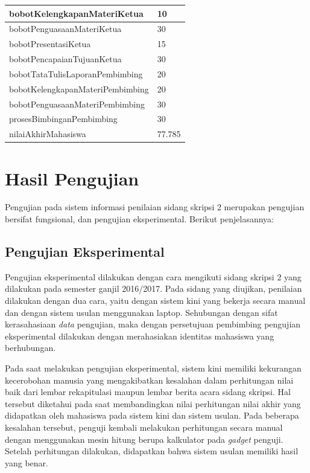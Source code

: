 \begin{enumerate}
\begin{table}[htbp]
\begin{tabular}{| m{7cm} | m{5cm} |}
				\hline
				bobotKelengkapanMateriKetua & 10\\
				\hline
				bobotPenguasaanMateriKetua & 30\\
				\hline
				bobotPresentasiKetua & 15\\
				\hline
				bobotPencapaianTujuanKetua & 30\\
				\hline
				bobotTataTulisLaporanPembimbing & 20\\
				\hline
				bobotKelengkapanMateriPembimbing &20\\
				\hline
				bobotPenguasaanMateriPembimbing & 30\\
				\hline
				prosesBimbinganPembimbing & 30\\
				\hline
				nilaiAkhirMahasiswa & 77.785\\
				\hline
			\end{tabular}
		\end{table}
	\end{enumerate}
	
\section{Hasil Pengujian}
\label{sec:hasilUji}

	Pengujian pada sistem informasi penilaian sidang skripsi 2 merupakan pengujian bersifat fungsional, dan pengujian eksperimental. Berikut penjelasannya:
	
	\subsection{Pengujian Eksperimental}
	\label{sub: PEksperimen}
	
	Pengujian eksperimental dilakukan dengan cara mengikuti sidang skripsi 2 yang dilakukan pada semester ganjil 2016/2017. Pada sidang yang diujikan, penilaian dilakukan dengan dua cara, yaitu dengan sistem kini yang bekerja secara manual dan dengan sistem usulan menggunakan laptop. Sehubungan dengan sifat kerasahasiaan \textit{data} pengujian, maka dengan persetujuan pembimbing pengujian eksperimental dilakukan dengan merahasiakan identitas mahasiswa yang berhubungan.
	
	Pada saat melakukan pengujian eksperimental, sistem kini memiliki kekurangan kecerobohan manusia yang mengakibatkan kesalahan dalam perhitungan nilai baik dari lembar rekapitulasi maupun lembar berita acara sidang skripsi. Hal tersebut diketahui pada saat membandingkan nilai perhitungan nilai akhir yang didapatkan oleh mahasiswa pada sistem kini dan sistem usulan. Pada beberapa kesalahan tersebut, penguji kembali melakukan perhitungan secara manual dengan menggunakan mesin hitung berupa kalkulator pada \textit{gadget} penguji. Setelah perhitungan dilakukan, didapatkan bahwa sistem usulan memiliki hasil yang benar.
	
